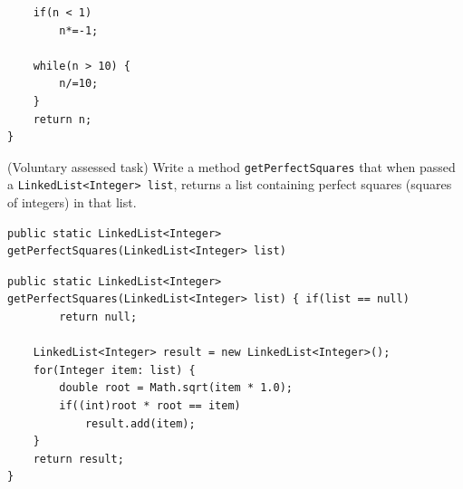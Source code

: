 \begin{questions}
\begin{solution}
\begin{lstlisting}
	if(n < 1)
		n*=-1;
	
	while(n > 10) {
		n/=10;
	}
	return n;
}
\end{lstlisting}	
\end{solution}


\question (Voluntary assessed task) Write a method \texttt{getPerfectSquares} that when passed a \texttt{LinkedList<Integer> list}, returns a list containing perfect squares (squares of integers) in that list.

\begin{lstlisting}
public static LinkedList<Integer> getPerfectSquares(LinkedList<Integer> list)
\end{lstlisting}

\begin{solution}
\begin{lstlisting}
public static LinkedList<Integer> getPerfectSquares(LinkedList<Integer> list) {	if(list == null)
		return null;

	LinkedList<Integer> result = new LinkedList<Integer>();
	for(Integer item: list) {
		double root = Math.sqrt(item * 1.0);
		if((int)root * root == item)
			result.add(item);
	}
	return result;
}
\end{lstlisting}
\end{solution}
\end{questions}
	

